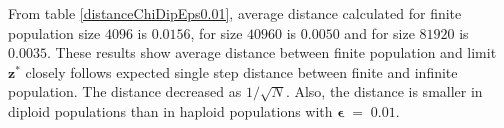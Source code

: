 From table \ref{distanceChiDipEps0.01}, average distance calculated for finite population size $4096$ is $0.0156$, 
for size $40960$ is $0.0050$ and for size $81920$ is $0.0035$. These results show average distance 
between finite population and limit $\bm{z^\ast}$ closely follows expected single step distance 
between finite and infinite population. The distance decreased as $1/\sqrt{N}$. 
Also, the distance is smaller in diploid populations than in haploid populations with $\bm{\epsilon} \;=\; 0.01$.


